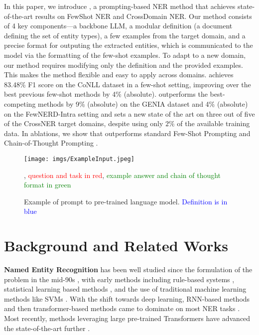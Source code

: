 \documentclass[11pt]{article}
\begin{document}
In this paper, we introduce \toolname,
a prompting-based NER method
that achieves state-of-the-art results 
on FewShot NER and CrossDomain NER. 
Our method consists of 4 key components---a 
backbone LLM, a modular definition 
(a document defining the set of entity types), 
a few examples from the target domain, and a precise format for outputing
the extracted entities, which is communicated to the model
via the formatting of the few-shot examples. 
To adapt to a new domain, our method requires modifying
only the definition and the provided examples.
This makes the method flexible and easy to apply across domains.
\toolname achieves 83.48\% F1 score on the CoNLL dataset \citep{sang2003introduction} in a few-shot setting, improving over the best previous few-shot methods by 4\% (absolute). \toolname outperforms the best-competing methods by 9\% (absolute) on the GENIA \citep{kim2003genia} dataset and 4\% (absolute)
on the FewNERD-Intra \citep{ding2021few} setting
and sets a new state of the art on three out of five
of the CrossNER \citep{liu2021crossner} target domains,
despite using only $2\%$ of the available training data.
In ablations, we show that \toolname outperforms
standard Few-Shot Prompting \citep{brown2020language} 
and Chain-of-Thought Prompting \citep{wei2022chain}.  

 
\begin{figure*}[th]
    \centering
    \texttt{[image: imgs/ExampleInput.jpeg]}
    \caption{Example of prompt to pre-trained language model. \textcolor{blue}{Definition is in blue}}, \textcolor{red}{question and task in red}, \textcolor{green}{example answer and chain of thought format in green}
    \label{fig:example}
\end{figure*}


\section{Background and Related Works}

\noindent\textbf{Named Entity Recognition} has been well studied
since the formulation of the problem in the mid-90s \citep{chinchor1995muc}, 
with early methods including rule-based systems \citep{eftimov2017rule, farmakiotou2000rule, mikheev1999named}, statistical learning based methods \citep{borthwick1998exploiting, borthwick1999maximum, zhou2002named},
and the use of traditional machine learning methods like SVMs \citep{makino2002tuning, mayfield2003named}. 
With the shift towards deep learning,
RNN-based methods and then transformer-based methods
came to dominate on most NER tasks \citep{de2015survey, huang2015bidirectional, limsopatham2016bidirectional}. 
Most recently, methods leveraging large pre-trained Transformers have advanced the state-of-the-art further \citep{lu2022unified, wang2022deepstruct, yu2020named, tong2022improving, lu2022punifiedner, li2022unified}. 
\end{document}
